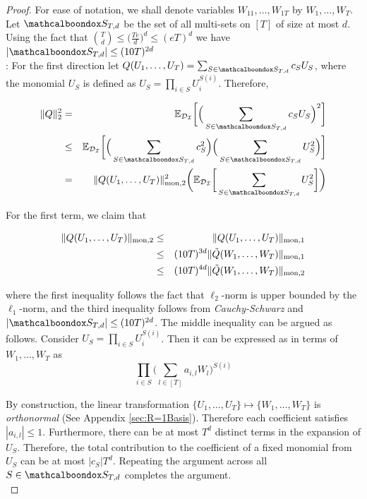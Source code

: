 \begin{proof}
	For ease of notation, we shall denote variables $W_{11},\ldots,W_{1T}$ by $W_{1},\ldots,W_{T}$. Let $\mcb{S}_{T,d}$ be the set of all multi-sets on $[T]$ of size at most $d$. Using the fact that ${T\choose d} \le \Big(\frac{Te}{d}\Big)^d \le (eT)^{d}$ we have $|\mcb{S}_{T,d}| \le (10T)^{2d}$\\ 
	
	:  For the first direction let ${Q}(U_1,\ldots,U_T) = \sum_{S \in \mcb{S}_{T,d}}c_SU_S$, where the monomial $U_S$ is defined as $U_S = \prod_{i \in S}U^{S(i)}_i$. Therefore,
	
	\begin{eqnarray}
	\|Q\|^2_2 &=& \E_{\mc{D}_{\mc{I}}}\bigg[\Big( \sum_{S \in \mcb{S}_{T,d}} c_SU_S\Big)^2\bigg] \\
	&\le& \E_{\mc{D}_{\mc{I}}}\bigg[ \Big(\sum_{S \in \mcb{S}_{T,d}} c^2_S\Big) \Big(\sum_{S \in \mcb{S}_{T,d}} U^2_S\Big)\bigg] \\
	&=&  \|Q(U_1,\ldots,U_T)\|^2_{\rm mon,2} \bigg(\E_{\mc{D}_{\mc{I}}}\bigg[\sum_{S \in \mcb{S}_{T,d}} U^2_S\bigg]\bigg) 	\label{eq:appx1}
	\end{eqnarray}		
	
	For the first term, we claim that 
	
	\begin{eqnarray*}
	\|Q(U_1,\ldots,U_T)\|_{\rm mon,2} &\le& \|Q(U_1,\ldots,U_T)\|_{\rm mon,1} \\
	&\le& ({10T})^{3d} \|\tilde{Q}(W_{1},\ldots,W_{T})\|_{\rm mon,1} \\
	&\le& ({10T})^{4d} \|\tilde{Q}(W_1,\ldots,W_T)\|_{\rm mon,2} 
	\end{eqnarray*}
	
	\noindent where the first inequality follows the fact that $\ell_2$-norm is upper bounded by the $\ell_1$-norm, and the third inequality follows from \emph{Cauchy-Schwarz} and $|\mcb{S}_{T,d}| \le (10T)^{2d}$. The middle inequality can be argued as follows. Consider $U_S = \prod_{i \in S} U^{S(i)}_i $. Then it can be expressed as in terms of $W_{1},\ldots,W_{T}$ as 
	\begin{equation*}
		\prod_{i \in S} \Big(\sum_{l \in [T]} a_{i,l}W_{l}\Big)^{S(i)} 
	\end{equation*}
	
	By construction, the linear transformation $\{U_1,\ldots,U_T\} \mapsto \{W_1,\ldots,W_T\}$ is \emph{orthonormal} (See Appendix \ref{sec:R=1Basis}). Therefore each coefficient satisfies $|a_{i,l}| \le 1$. Furthermore, there can be at most $T^d$ distinct terms in the expansion of $U_S$. Therefore, the total contribution to the coefficient of a fixed monomial from $U_S$ can be at most $|c_S|T^d$. Repeating the argument across all $S \in \mcb{S}_{T,d}$ completes the argument. \\
	

\end{proof}
